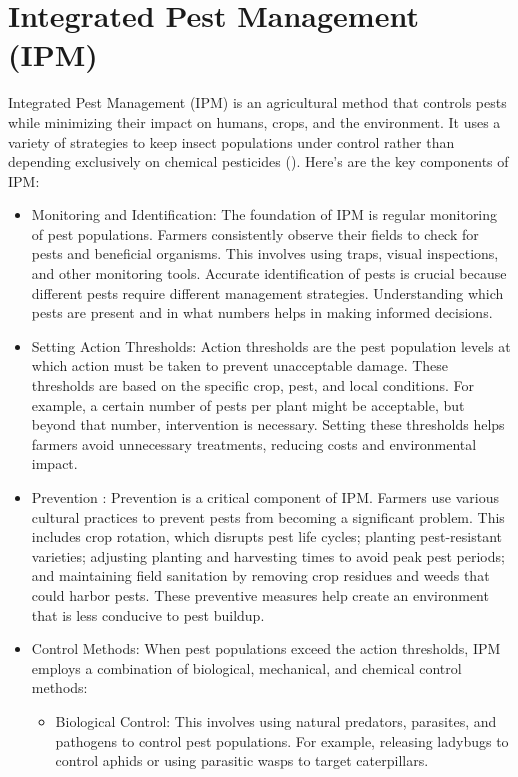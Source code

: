 \section{Integrated Pest Management (IPM)}
Integrated Pest Management (IPM) is an agricultural method that controls pests while minimizing their impact on humans, crops, and the environment. It uses a variety of strategies to keep insect populations under control rather than depending exclusively on chemical pesticides (\cite{usepa_2014_managing}). Here’s are the key components of IPM:
\begin{itemize}
    \item Monitoring and Identification: The foundation of IPM is regular monitoring of pest populations. Farmers consistently observe their fields to check for pests and beneficial organisms. This involves using traps, visual inspections, and other monitoring tools. Accurate identification of pests is crucial because different pests require different management strategies. Understanding which pests are present and in what numbers helps in making informed decisions.
    \item Setting Action Thresholds: Action thresholds are the pest population levels at which action must be taken to prevent unacceptable damage. These thresholds are based on the specific crop, pest, and local conditions. For example, a certain number of pests per plant might be acceptable, but beyond that number, intervention is necessary. Setting these thresholds helps farmers avoid unnecessary treatments, reducing costs and environmental impact.
    \item Prevention : Prevention is a critical component of IPM. Farmers use various cultural practices to prevent pests from becoming a significant problem. This includes crop rotation, which disrupts pest life cycles; planting pest-resistant varieties; adjusting planting and harvesting times to avoid peak pest periods; and maintaining field sanitation by removing crop residues and weeds that could harbor pests. These preventive measures help create an environment that is less conducive to pest buildup.
    \item Control Methods: When pest populations exceed the action thresholds, IPM employs a combination of biological, mechanical, and chemical control methods:
    \begin{itemize}
        \item Biological Control: This involves using natural predators, parasites, and pathogens to control pest populations. For example, releasing ladybugs to control aphids or using parasitic wasps to target caterpillars.

\end{itemize}
\end{itemize}
